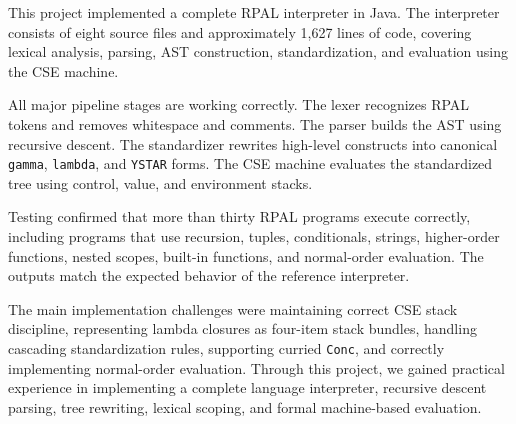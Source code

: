 \documentclass[12pt,a4paper]{article}
\begin{document}
This project implemented a complete RPAL interpreter in Java. The interpreter consists of eight source files and approximately 1,627 lines of code, covering lexical analysis, parsing, AST construction, standardization, and evaluation using the CSE machine.

All major pipeline stages are working correctly. The lexer recognizes RPAL tokens and removes whitespace and comments. The parser builds the AST using recursive descent. The standardizer rewrites high-level constructs into canonical \texttt{gamma}, \texttt{lambda}, and \texttt{YSTAR} forms. The CSE machine evaluates the standardized tree using control, value, and environment stacks.

Testing confirmed that more than thirty RPAL programs execute correctly, including programs that use recursion, tuples, conditionals, strings, higher-order functions, nested scopes, built-in functions, and normal-order evaluation. The outputs match the expected behavior of the reference interpreter.

The main implementation challenges were maintaining correct CSE stack discipline, representing lambda closures as four-item stack bundles, handling cascading standardization rules, supporting curried \texttt{Conc}, and correctly implementing normal-order evaluation. Through this project, we gained practical experience in implementing a complete language interpreter, recursive descent parsing, tree rewriting, lexical scoping, and formal machine-based evaluation.
\end{document}
